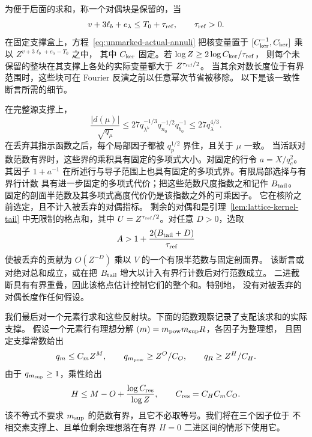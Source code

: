 为便于后面的求和，称一个对偶块是保留的，当
\[
 v+3\ell_b+e_\lambda\le T_0+\tau_{\rm ref},
 \qquad \tau_{\rm ref}>0.
\]
在固定支撑盒上，方程~\eqref{eq:unmarked-actual-annuli} 把核变量置于
$[C_{\rm ker}^{-1},C_{\rm ker}]$ 乘以 $Z^{v+3\ell_b+e_\lambda-T_0}$ 之中，
其中 $C_{\rm ker}$ 固定。若 $\log Z\ge2\log C_{\rm ker}/\tau_{\rm ref}$，
则每个未保留的整块在其支撑上各处的实际变量都大于 $Z^{\tau_{\rm ref}/2}$。
当其余对数长度位于有界范围时，这些块可在 Fourier 反演之前以任意幂次节省被移除。
以下是该一致性断言所需的细节。

在完整源支撑上，
\[
 \frac{|d(\mu)|}{\sqrt{q_\mu}}
 \le27q_{\lambda^k}^{-1/3}q_{n_0}^{-1/2}q_{b_0}^{-1}
 \le27q_\lambda^{4/3}.
\]
在丢弃其指示函数之后，每个局部因子都被 $q_p^{1/2}$ 界住，且关于 $\mu$ 一致。
当活跃对数范数有界时，这些界的乘积具有固定的多项式大小。对固定的行令 $a=X/q_c^2$。
其因子 $1+a^{-1}$ 在所述行与导子范围上也具有固定的多项式界。有限局部选择与有界行计数
具有进一步固定的多项式代价；把这些范数尺度指数之和记作 $B_{\rm tail}$。
固定的剖面半范数及其多项式高度代价仍是该指数之外的可乘因子。
它在核阶之前选定，且不计入被丢弃的对偶指标。
剩余的对偶和是引理~\ref{lem:lattice-kernel-tail} 中无限制的格点和，其中
$U=Z^{\tau_{\rm ref}/2}$。对任意 $D>0$，选取
\[
 A>1+\frac{2(B_{\rm tail}+D)}{\tau_{\rm ref}}
\]
使被丢弃的贡献为 $O(Z^{-D})$ 乘以 $V$ 的一个有限半范数与固定剖面界。
该断言或对绝对总和成立，或在把 $B_{\rm tail}$ 增大以计入有界行计数后对行范数成立。
二进截断具有有界重叠，因此该格点估计控制它们的整个和。特别地，
没有对被丢弃的对偶长度作任何假设。

我们最后对一个元素行求和这些反射块。下面的范数观察记录了支配该求和的实际支撑。
假设一个元素行有理想分解 $(m)=m_{\rm pow}m_{\rm sup}R$，各因子为整理想，
且固定支撑常数给出
\[
 q_m\le C_mZ^M,\qquad q_{m_{\rm pow}}\ge Z^O/C_O,
 \qquad q_R\ge Z^H/C_H.
\]
由于 $q_{m_{\rm sup}}\ge1$，乘性给出
\begin{equation}\label{eq:actual-residual-row-dyad}
 H\le M-O+\frac{\log C_{\rm res}}{\log Z},
 \qquad C_{\rm res}=C_HC_mC_O.
\end{equation}
该不等式不要求 $m_{\rm sup}$ 的范数有界，且它不必取等号。我们将在三个因子位于
不相交素支撑上、且单位剩余理想落在有界 $H=0$ 二进区间的情形下使用它。

